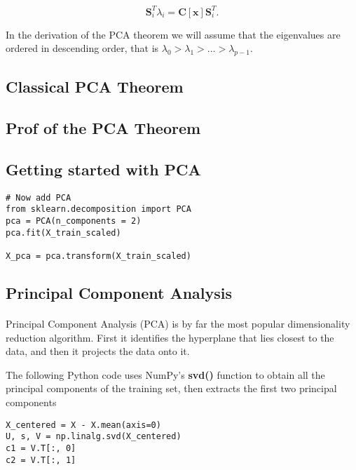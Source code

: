 \documentclass[%
oneside,                 %
final,                   %
10pt]{article}
\begin{document}
\[
\bm{S}^T_i\lambda_i = \bm{C}[\bm{x}]\bm{S}^T_i.
\]

In the derivation of the PCA theorem we will assume that the eigenvalues are ordered in descending order, that is
$\lambda_0 > \lambda_1 > \dots > \lambda_{p-1}$. 

\subsection*{Classical PCA Theorem}



\subsection*{Prof of the PCA Theorem}






\subsection*{Getting started with PCA}


\begin{verbatim}
# Now add PCA
from sklearn.decomposition import PCA
pca = PCA(n_components = 2)
pca.fit(X_train_scaled)

X_pca = pca.transform(X_train_scaled)
\end{verbatim}



\subsection*{Principal Component Analysis}

\paragraph{}
Principal Component Analysis (PCA) is by far the most popular dimensionality reduction algorithm.
First it identifies the hyperplane that lies closest to the data, and then it projects the data onto it.

The following Python code uses NumPy’s \textbf{svd()} function to obtain all the principal components of the
training set, then extracts the first two principal components
\begin{verbatim}
X_centered = X - X.mean(axis=0)
U, s, V = np.linalg.svd(X_centered)
c1 = V.T[:, 0]
c2 = V.T[:, 1]
\end{verbatim}
\end{document}
